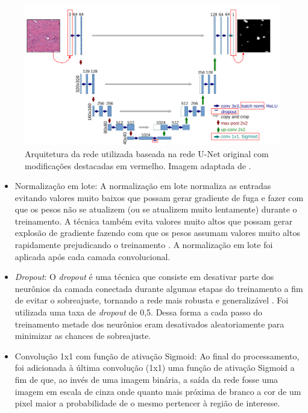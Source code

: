 \begin{figure}[H]
  \centering
  \includegraphics[width=.9\linewidth]{figures/2_theoric_foundamentations/dali/unet.png}
  \caption[Arquitetura da rede utilizada]{Arquitetura da rede utilizada baseada na rede U-Net original com modificações destacadas em vermelho. Imagem adaptada de \cite{santos2022automated}.}
  \label{fig:dali-unet}
\end{figure}

 \begin{itemize}
   \item Normalização em lote: A normalização em lote normaliza as entradas evitando valores muito baixos que possam gerar gradiente de fuga e fazer com que os pesos não se atualizem (ou se atualizem muito lentamente) durante o treinamento. A técnica também evita valores muito altos que possam gerar explosão de gradiente fazendo com que os pesos assumam valores muito altos rapidamente prejudicando o treinamento \cite{geron2019maos}. A normalização em lote foi aplicada após cada camada convolucional.
   \item \textit{Dropout}: O \textit{dropout} é uma técnica que consiste em desativar parte dos neurônios da camada conectada durante algumas etapas do treinamento a fim de evitar o sobreajuste, tornando a rede mais robusta e generalizável \cite{geron2019maos}. Foi utilizada uma taxa de \textit{dropout} de 0,5. Dessa forma a cada passo do treinamento metade dos neurônios eram desativados aleatoriamente para minimizar as chances de sobreajuste.
   \item Convolução 1x1 com função de ativação Sigmoid: Ao final do processamento, foi adicionada à última convolução (1x1) uma função de ativação Sigmoid a fim de que, ao invés de uma imagem binária, a saída da rede fosse uma imagem em escala de cinza onde quanto mais próxima de branco a cor de um pixel maior a probabilidade de o mesmo pertencer à região de interesse.
 \end{itemize}



